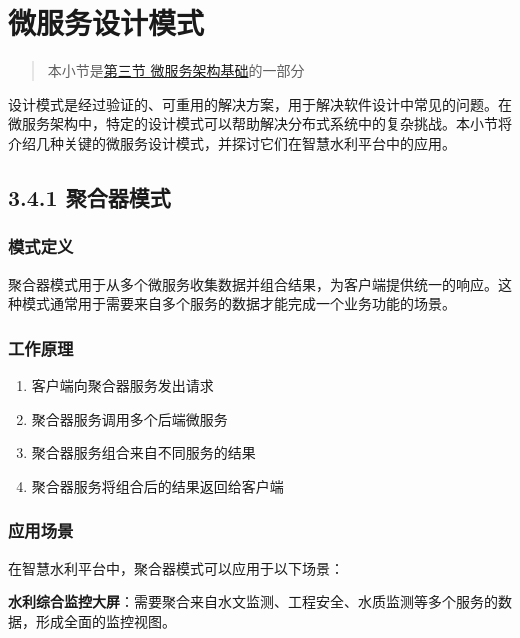 \section{微服务设计模式}\label{ux5faeux670dux52a1ux8bbeux8ba1ux6a21ux5f0f}

\begin{quote}
本小节是\href{section03-03.md}{第三节 微服务架构基础}的一部分
\end{quote}

设计模式是经过验证的、可重用的解决方案，用于解决软件设计中常见的问题。在微服务架构中，特定的设计模式可以帮助解决分布式系统中的复杂挑战。本小节将介绍几种关键的微服务设计模式，并探讨它们在智慧水利平台中的应用。

\subsection{3.4.1 聚合器模式}\label{ux805aux5408ux5668ux6a21ux5f0f}

\subsubsection{模式定义}\label{ux6a21ux5f0fux5b9aux4e49}

聚合器模式用于从多个微服务收集数据并组合结果，为客户端提供统一的响应。这种模式通常用于需要来自多个服务的数据才能完成一个业务功能的场景。

\subsubsection{工作原理}\label{ux5de5ux4f5cux539fux7406}

\begin{enumerate}
\def\labelenumi{\arabic{enumi}.}
\tightlist
\item
  客户端向聚合器服务发出请求
\item
  聚合器服务调用多个后端微服务
\item
  聚合器服务组合来自不同服务的结果
\item
  聚合器服务将组合后的结果返回给客户端
\end{enumerate}

\subsubsection{应用场景}\label{ux5e94ux7528ux573aux666f}

在智慧水利平台中，聚合器模式可以应用于以下场景：

\textbf{水利综合监控大屏}：需要聚合来自水文监测、工程安全、水质监测等多个服务的数据，形成全面的监控视图。

